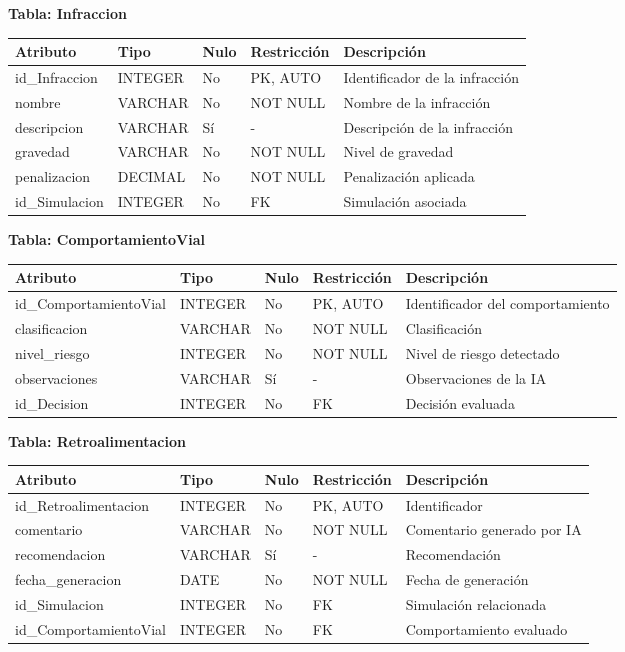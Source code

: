 \documentclass[12pt]{article}
\begin{document}
\textbf{Tabla: Infraccion}
\begin{table}[H]
\centering
\begin{tabular}{|p{3cm}|p{2cm}|p{1cm}|p{2cm}|p{5cm}|}
\hline
\textbf{Atributo} & \textbf{Tipo} & \textbf{Nulo} & \textbf{Restricción} & \textbf{Descripción} \\ \hline
id\_Infraccion & INTEGER & No & PK, AUTO & Identificador de la infracción \\ \hline
nombre & VARCHAR & No & NOT NULL & Nombre de la infracción \\ \hline
descripcion & VARCHAR & Sí & - & Descripción de la infracción \\ \hline
gravedad & VARCHAR & No & NOT NULL & Nivel de gravedad \\ \hline
penalizacion & DECIMAL & No & NOT NULL & Penalización aplicada \\ \hline
id\_Simulacion & INTEGER & No & FK & Simulación asociada \\ \hline
\end{tabular}
\end{table}

\textbf{Tabla: ComportamientoVial}
\begin{table}[H]
\centering
\begin{tabular}{|p{3cm}|p{2cm}|p{1cm}|p{2cm}|p{5cm}|}
\hline
\textbf{Atributo} & \textbf{Tipo} & \textbf{Nulo} & \textbf{Restricción} & \textbf{Descripción} \\ \hline
id\_ComportamientoVial & INTEGER & No & PK, AUTO & Identificador del comportamiento \\ \hline
clasificacion & VARCHAR & No & NOT NULL & Clasificación \\ \hline
nivel\_riesgo & INTEGER & No & NOT NULL & Nivel de riesgo detectado \\ \hline
observaciones & VARCHAR & Sí & - & Observaciones de la IA \\ \hline
id\_Decision & INTEGER & No & FK & Decisión evaluada \\ \hline
\end{tabular}
\end{table}

\textbf{Tabla: Retroalimentacion}
\begin{table}[H]
\centering
\begin{tabular}{|p{3cm}|p{2cm}|p{1cm}|p{2cm}|p{5cm}|}
\hline
\textbf{Atributo} & \textbf{Tipo} & \textbf{Nulo} & \textbf{Restricción} & \textbf{Descripción} \\ \hline
id\_Retroalimentacion & INTEGER & No & PK, AUTO & Identificador \\ \hline
comentario & VARCHAR & No & NOT NULL & Comentario generado por IA \\ \hline
recomendacion & VARCHAR & Sí & - & Recomendación \\ \hline
fecha\_generacion & DATE & No & NOT NULL & Fecha de generación \\ \hline
id\_Simulacion & INTEGER & No & FK & Simulación relacionada \\ \hline
id\_ComportamientoVial & INTEGER & No & FK & Comportamiento evaluado \\ \hline
\end{tabular}
\end{table}
\end{document}
